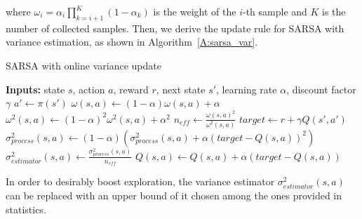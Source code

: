 where $\omega_i = \alpha_i\prod_{k=i+1}^K{(1-\alpha_k)}$ is the weight of the $i$-th sample and $K$ is the number of collected samples.
Then, we derive the update rule for SARSA with variance estimation, as shown in Algorithm~\ref{A:sarsa_var}.
\begin{algorithm}[t]
\caption{SARSA with online variance update}
\begin{algorithmic}[1]\label{A:sarsa_var}
  \STATE \textbf{Inputs:} state $s$, action $a$, reward $r$, next state $s'$, learning rate $\alpha$, discount factor $\gamma$
  \STATE $a' \gets \pi(s')$
  \STATE $\omega (s,a) \gets (1 - \alpha) \omega (s,a) + \alpha$
  \STATE $\omega^2 (s,a) \gets (1 - \alpha)^2 \omega^2 (s,a) + \alpha ^2$
  \STATE $n_{eff} \gets \frac{\omega(s,a)^2}{\omega^2(s,a)} $
  \STATE $target \gets r + \gamma Q(s',a')$
  \STATE $\sigma^2_{process}(s,a) \gets (1 - \alpha)\left(\sigma^2_{process}(s,a) + \alpha (target - Q(s,a))^2\right)$
  \STATE $\sigma^2_{estimator}(s,a) \gets \frac{\sigma ^2_{process}(s,a)}{n_{eff}}$
  \STATE $Q(s,a) \gets Q(s,a) + \alpha \left(target - Q(s,a)\right)$
\end{algorithmic}
\end{algorithm}
In order to desirably boost exploration, the variance estimator $\sigma^2_{estimator}(s,a)$ can be replaced with an upper bound of it chosen among the ones provided in statistics.
